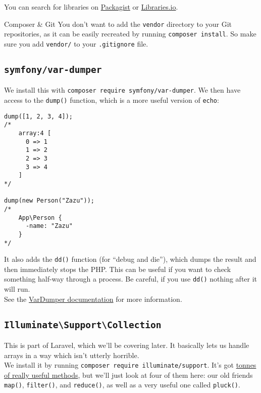 You can search for libraries on \href{https://packagist.org}{Packagist} or \href{https://libraries.io/search?languages=PHP}{Libraries.io}.


\begin{infobox}{Composer \& Git}
    You don't want to add the \texttt{vendor} directory to your Git repositories, as it can be easily recreated by running \texttt{composer install}. So make sure you add \texttt{vendor/} to your \texttt{.gitignore} file.
\end{infobox}


\subsection{\texttt{symfony/var-dumper}}

We install this with \texttt{composer require symfony/var-dumper}. We then have access to the \texttt{dump()} function, which is a more useful version of \texttt{echo}:

\begin{verbatim}
dump([1, 2, 3, 4]);
/*
    array:4 [
      0 => 1
      1 => 2
      2 => 3
      3 => 4
    ]
*/

dump(new Person("Zazu"));
/*
    App\Person {
      -name: "Zazu"
    }
*/
\end{verbatim}

It also adds the \texttt{dd()} function (for ``debug and die''), which dumps the result and then immediately stops the PHP. This can be useful if you want to check something half-way through a process. Be careful, if you use \texttt{dd()} nothing after it will run.
\\

See the \href{https://symfony.com/doc/current/components/var_dumper.html}{VarDumper documentation} for more information.


\subsection{\texttt{Illuminate\textbackslash Support\textbackslash Collection}}

This is part of Laravel, which we'll be covering later. It basically lets us handle arrays in a way which isn't utterly horrible.
\\

We install it by running \texttt{composer require illuminate/support}. It's got \href{http://laravel.com/docs/master/collections#available-methods}{tonnes of really useful methods}, but we'll just look at four of them here: our old friends \texttt{map()}, \texttt{filter()}, and \texttt{reduce()}, as well as a very useful one called \texttt{pluck()}.
\\

